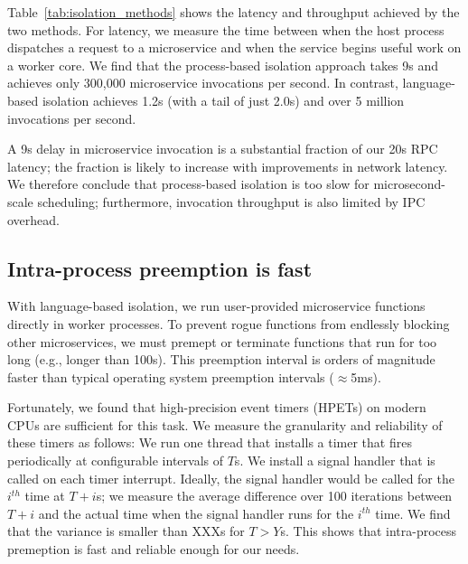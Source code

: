 Table~\ref{tab:isolation_methods} shows the latency and throughput achieved
by the two methods. For latency, we measure the time between when the host
process dispatches a request to a microservice and when the service begins
useful work on a worker core. We find that the process-based isolation approach
takes 9\textmu{}s and achieves only 300,000 microservice invocations per
second. In contrast, language-based isolation achieves 1.2\textmu{}s (with a tail
of just 2.0\textmu{}s) and over 5 million invocations per second.

A 9\textmu{}s delay in microservice invocation is a substantial fraction of our
20\textmu{}s RPC latency;  the fraction is likely to increase with
improvements in network latency. We therefore conclude that process-based
isolation is too slow for microsecond-scale scheduling; furthermore, invocation
throughput is also limited by IPC overhead.

\subsection{Intra-process preemption is fast}
With language-based isolation, we run user-provided microservice functions
directly in worker processes. To prevent rogue functions from endlessly blocking
other microservices, we must premept or terminate functions that run for too
long (e.g., longer than 100\textmu{}s).  This
preemption interval is orders of magnitude faster than typical operating
system preemption intervals ($\approx$5ms).

Fortunately, we found that high-precision event timers (HPETs) on modern CPUs
are sufficient for this task. We measure the granularity and reliability of
these timers as follows: We run one thread that installs a timer that fires
periodically at configurable intervals of $T$\textmu{}s. We install a signal
handler that is called on each timer interrupt. Ideally, the signal handler
would be called for the $i^{th}$ time at $T + i$\textmu{}s; we measure the
average difference over 100 iterations between $T + i$ and the actual time
when the signal handler runs for the $i^{th}$ time. We find that the variance
is smaller than XXX\textmu{}s for $T > Y$\textmu{}s. This shows that
intra-process premeption is fast and reliable enough for our needs.
